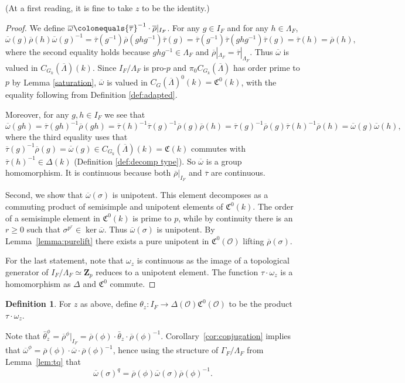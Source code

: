 \documentclass[11pt, letterpaper,english]{amsart}
\theoremstyle{plain}
\theoremstyle{definition}
\newtheorem{defn}[lem]{Definition}
\numberwithin{equation}{section}
\numberwithin{lem}{section}
\newcommand{\mathfont}{\mathbf}
\newcommand{\Z}{\mathfont Z}
\newcommand{\fC}{\mathfrak{C}}
\newcommand{\cO}{\mathcal{O}}
\newcommand{\rhobar}{{\overline{\rho}}}
\newcommand{\taubar}{{\overline{\tau}}}
\newcommand{\omegabar}{{\overline{\omega}}}
\newcommand{\cent}[2]{C_{#1}(#2)}
\newcommand{\Ld}{\Lambda}
\newcommand{\Lbar}{\overline{\Lambda}}
\newcommand{\Dt}{\Delta}
\begin{document}
(At a first reading, it is fine to take $z$ to be the identity.)

\begin{proof}
We define $\omegabar \colonequals \taubar^{-1} \cdot \rhobar|_{I_F}$. For any $g \in I_F$ and for any $h \in \Ld_F$, 
\[\omegabar(g)\rhobar(h)\omegabar(g)^{-1}=\taubar(g^{-1})\rhobar(ghg^{-1})\taubar(g)=\taubar(g^{-1})\taubar(ghg^{-1})\taubar(g)=\taubar(h)=\rhobar(h),\]
where the second equality holds because $ghg^{-1} \in \Ld_F$ and $\rhobar|_{\Ld_F}=\taubar|_{\Ld_F}$. Thus $\omegabar$ is valued in $\cent{G_{k}}{\Lbar}(k)$. 
Since $I_F/\Ld_F$ is pro-$p$ and $\pi_0\cent{G_{k}}{\Lbar}$ has order prime to $p$ by Lemma \ref{saturation},
$\omegabar$ is valued in $\cent{G}{\Lbar}^0(k)=\fC^0(k)$, with the equality following from Definition \ref{def:adapted}.


Moreover, for any $g,h \in I_F$ we see that
\[
\omegabar(gh)=\taubar(gh)^{-1}\rhobar(gh)=\taubar(h)^{-1}\taubar(g)^{-1}\rhobar(g)\rhobar(h)=\taubar(g)^{-1}\rhobar(g)\taubar(h)^{-1}\rhobar(h)=\omegabar(g)\omegabar(h),\] where the third equality uses that $\taubar(g)^{-1}\rhobar(g)=\omegabar(g) \in \cent{G_{k}}{\Lbar}(k)=\fC(k)$ commutes with $\taubar(h)^{-1} \in \Dt(k)$ (Definition \ref{def:decomp type}).
So $\omegabar$ is a group homomorphism. It is continuous because both $\rhobar|_{I_F}$ and $\taubar$ are continuous.

Second, we show that $\omegabar(\sigma)$ is unipotent.
This element decomposes as a commuting product of semisimple and unipotent elements of $\fC^0(k)$. The
order of a semisimple element in $\fC^0(k)$ is prime to $p$,  while by continuity there is an $r \geq 0$ such that $\sigma^{p^r} \in \ker \omegabar$. Thus $\omegabar(\sigma)$ is unipotent. By Lemma~\ref{lemma:purelift} there exists a pure unipotent in $\fC^0(\cO)$ lifting $\rhobar(\sigma)$.

For the last statement, note that $\omega_z$ is continuous as the image of a topological generator of $I_F /\Lambda_F \simeq \Z_p$ reduces to a unipotent element.  The function $\tau \cdot \omega_z$ is a homomorphism 
 as $\Dt$ and $\fC^0$ commute. 
\end{proof}

\begin{defn} \label{def:theta}
For $z$ as above, define $\theta_z : I_F \to \Delta(\cO) \fC^0(\cO)$ to be the product $\tau \cdot \omega_z$.
\end{defn}

 Note that $\bar\theta^{\phi}_z= \rhobar^{\phi} |_{I_F} =  \rhobar(\phi) \cdot \bar\theta_z \cdot \rhobar(\phi)^{-1}$.  Corollary~\ref{cor:conjugation} implies that $\omegabar^{\phi}=\rhobar(\phi) \cdot \omegabar \cdot \rhobar(\phi)^{-1}$, hence using the structure of $\Gamma_F/\Lambda_F$ from Lemma~\ref{lem:tq} that
\begin{equation} \label{eq:conjugationmodp}
     \overline{\omega}(\sigma)^q = \rhobar(\phi) \overline{\omega}(\sigma) \rhobar(\phi)^{-1}.
 \end{equation}
\end{document}
